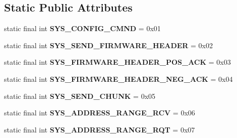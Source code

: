 \subsection*{Static Public Attributes}
\begin{DoxyCompactItemize}
\item 
\mbox{\label{classcom_1_1hobby_1_1smart_1_1bluetoothcomm_1_1_system_states_af53560d70a5e800b48a698dc833a2bd1}} 
static final int {\bfseries S\+Y\+S\+\_\+\+C\+O\+N\+F\+I\+G\+\_\+\+C\+M\+ND} = 0x01
\item 
\mbox{\label{classcom_1_1hobby_1_1smart_1_1bluetoothcomm_1_1_system_states_a8f2517d22c21f7e13f0c321a21e100ff}} 
static final int {\bfseries S\+Y\+S\+\_\+\+S\+E\+N\+D\+\_\+\+F\+I\+R\+M\+W\+A\+R\+E\+\_\+\+H\+E\+A\+D\+ER} = 0x02
\item 
\mbox{\label{classcom_1_1hobby_1_1smart_1_1bluetoothcomm_1_1_system_states_a4271aba62d62dd2d1a2979be9f05de02}} 
static final int {\bfseries S\+Y\+S\+\_\+\+F\+I\+R\+M\+W\+A\+R\+E\+\_\+\+H\+E\+A\+D\+E\+R\+\_\+\+P\+O\+S\+\_\+\+A\+CK} = 0x03
\item 
\mbox{\label{classcom_1_1hobby_1_1smart_1_1bluetoothcomm_1_1_system_states_a80af8acaefba81d49c300e8774ef4ea3}} 
static final int {\bfseries S\+Y\+S\+\_\+\+F\+I\+R\+M\+W\+A\+R\+E\+\_\+\+H\+E\+A\+D\+E\+R\+\_\+\+N\+E\+G\+\_\+\+A\+CK} = 0x04
\item 
\mbox{\label{classcom_1_1hobby_1_1smart_1_1bluetoothcomm_1_1_system_states_a02ef9b24962c8fa6b160254a9ac381c6}} 
static final int {\bfseries S\+Y\+S\+\_\+\+S\+E\+N\+D\+\_\+\+C\+H\+U\+NK} = 0x05
\item 
\mbox{\label{classcom_1_1hobby_1_1smart_1_1bluetoothcomm_1_1_system_states_a5079d6def9c5c555a874846d4daf02ea}} 
static final int {\bfseries S\+Y\+S\+\_\+\+A\+D\+D\+R\+E\+S\+S\+\_\+\+R\+A\+N\+G\+E\+\_\+\+R\+CV} = 0x06
\item 
\mbox{\label{classcom_1_1hobby_1_1smart_1_1bluetoothcomm_1_1_system_states_a011a939d0b3cfba20cf986316f417c4f}} 
static final int {\bfseries S\+Y\+S\+\_\+\+A\+D\+D\+R\+E\+S\+S\+\_\+\+R\+A\+N\+G\+E\+\_\+\+R\+QT} = 0x07
\end{DoxyCompactItemize}


